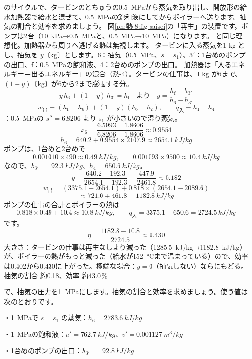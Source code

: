 \begin{phreidai}
\label{ph:熱-8:ex10}のサイクルで、タービンのとちゅうの\qty{0.5}{MPa}から蒸気を取り出し、開放形の給水加熱器で給水と混ぜて、\qty{0.5}{MPa}の飽和液にしてからボイラーへ送ります。抽気の割合と効率を求めましょう。
\phbamen
図\ref{ph:熱-8:fig-saisei}の「再生」の装置です。ポンプは2台（\qty{10}{kPa}→\qty{0.5}{MPa}と、\qty{0.5}{MPa}→\qty{10}{MPa}）になります。
\phmushi
{}と同じ理想化。加熱器から周りへ逃げる熱は無視します。
\phzu
タービンに入る蒸気を1 kg とし、抽気を $y$〔kg〕とします。6：抽気（\qty{0.5}{MPa}、$s=s_1$）、3$'$：1台めのポンプの出口、f：\qty{0.5}{MPa}の飽和液、4：2台めのポンプの出口。
\phriyu
加熱器は「入るエネルギー＝出るエネルギー」の混合（熱-4）。タービンの仕事は、1 kg が6まで、$(1-y)$〔kg〕が6から2まで膨張する分。
\phtateru
\[ y\,h_6+(1-y)\,h_{3'}=h_{\mathrm f}\quad\text{より}\quad y=\frac{h_{\mathrm f}-h_{3'}}{h_6-h_{3'}} \]
\[ w_{\text{出}}=(h_1-h_6)+(1-y)(h_6-h_2),\qquad q_{\text{入}}=h_1-h_4 \]
：\qty{0.5}{MPa}の $s''=6.8206$ より $s_1$ が小さいので湿り蒸気。
\[ x_6=\frac{6.5993-1.8606}{6.8206-1.8606}\approx0.9554 \]
\[ h_6=640.2+0.9554\times2107.9\approx\qty{2654.1}{kJ/kg} \]
ポンプは、1台めと2台めで
\[ 0.001010\times490\approx\qty{0.49}{kJ/kg},\qquad 0.001093\times9500\approx\qty{10.4}{kJ/kg} \]
なので、$h_{3'}=\qty{192.3}{kJ/kg}$、$h_4=\qty{650.6}{kJ/kg}$。
\[ y=\frac{640.2-192.3}{2654.1-192.3}=\frac{447.9}{2461.8}\approx0.182 \]
\[ w_{\text{出}}=(3375.1-2654.1)+0.818\times(2654.1-2089.6) \]
\[ \approx721.0+461.8=\qty{1182.8}{kJ/kg} \]
ポンプの仕事の合計とボイラーの熱は
\[ 0.818\times0.49+10.4\approx\qty{10.8}{kJ/kg},\qquad q_{\text{入}}=3375.1-650.6=\qty{2724.5}{kJ/kg} \]
です。
\[ \eta=\frac{1182.8-10.8}{2724.5}\approx0.430 \]
\phtashikame
大きさ：タービンの仕事は再生なしより減った（\qty{1285.5}{kJ/kg}→\qty{1182.8}{kJ/kg}）が、ボイラーの熱がもっと減った（給水が\qty{152}{\celsius}まで温まっている）ので、効率は0.402から0.430に上がった。極端な場合：$y=0$（抽気しない）ならにもどる。
\kotae 抽気の割合 約0.18、効率 約43.0\,\%
\end{phreidai}
\begin{jibun}
で、抽気の圧力を\qty{1}{MPa}にします。抽気の割合と効率を求めましょう。使う値は次のとおりです。
\par\noindent ・\qty{1}{MPa}で $s=s_1$ の蒸気：$h_6=\qty{2783.6}{kJ/kg}$
\par\noindent ・\qty{1}{MPa}の飽和液：$h'=\qty{762.7}{kJ/kg}$、$v'=\qty{0.001127}{m^3/kg}$
\par\noindent ・1台めのポンプの出口：$h_{3'}=\qty{192.8}{kJ/kg}$
\end{jibun}

